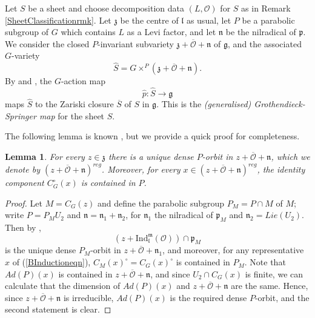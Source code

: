 \documentclass{amsart}
\newtheorem{lemma}[theorem]{Lemma}
\theoremstyle{remark}
\numberwithin{theorem}{section}
\numberwithin{equation}{section}
\begin{document}
Let $S$ be a sheet and choose decomposition data $(L,\mathcal O)$ for $S$ as in Remark \ref{SheetClassificationrmk}. Let $\mathfrak{z}$ be the centre of $\mathfrak{l}$ as usual, let $P$ be a parabolic subgroup of $G$ which contains $L$ as a Levi factor, and let $\mathfrak{n}$ be the nilradical of $\mathfrak{p}$. We consider the closed $P$-invariant subvariety $\mathfrak{z} + \overline{\mathcal O} +\mathfrak{n}$ of $\mathfrak{g}$, and the associated $G$-variety
\begin{equation}\label{GeneralisedGSeqn}
    \hat{S} = G \times^P (\mathfrak{z} + \overline{\mathcal O}+\mathfrak{n}).
\end{equation}
By \cite[Lemma 2.2]{Borho2} and \cite[Satz 3.1 (b)]{Borho2}, the $G$-action map
\begin{equation}\label{GeneralisedGSmapeqn}
    \hat{p}:\hat{S} \rightarrow \mathfrak{g}
\end{equation}
maps $\hat{S}$ to the Zariski closure $\overline{S}$ of $S$ in $\mathfrak{g}$. This is the \emph{(generalised) Grothendieck-Springer map} for the sheet $S$.

The following lemma is known \cite[Section 4.1]{Losev4}, but we provide a quick proof for completeness.

\begin{lemma}\label{BInductionlem}
    For every $z \in \mathfrak{z}$ there is a unique dense $P$-orbit in $z +\overline{\mathcal O} +\mathfrak{n}$, which we denote by $(z+ \overline{\mathcal O} +\mathfrak{n})^{reg}$. Moreover, for every $x \in (z+ \overline{\mathcal O} +\mathfrak{n})^{reg}$, the identity component $C_G^\circ(x)$ is contained in $P$. 
\end{lemma}

\begin{proof}
Let $M = C_G(z)$ and define the parabolic subgroup $P_M = P \cap M$ of $M$; write $P = P_MU_2$ and $\mathfrak{n} = \mathfrak{n}_1 + \mathfrak{n}_2$, for $\mathfrak{n}_1$ the nilradical of $\mathfrak{p}_M$ and $\mathfrak{n}_2 = Lie(U_2)$. Then by \cite[Theorem 1.3]{LS},
\begin{equation}\label{BInductioneqn}
    (z +\text{Ind}_{\mathfrak{l}}^{\mathfrak{m}}(\mathcal O)) \cap \mathfrak{p}_M
\end{equation}
is the unique dense $P_M$-orbit in $z +\overline{\mathcal O} +\mathfrak{n}_1$, and moreover, for any representative $x$ of (\ref{BInductioneqn}), $C_M(x)^\circ = C_G(x)^\circ$ is contained in $P_M$. Note that $Ad(P)(x)$ is contained in $z +\overline{\mathcal O} +\mathfrak{n}$, and since $U_2 \cap C_G(x)$ is finite, we can calculate that the dimension of $Ad(P)(x)$ and $z +\overline{\mathcal O} +\mathfrak{n}$ are the same. Hence, since $z +\overline{\mathcal O} +\mathfrak{n}$ is irreducible, $Ad(P)(x)$ is the required dense $P$-orbit, and the second statement is clear.
\end{proof}
\end{document}
